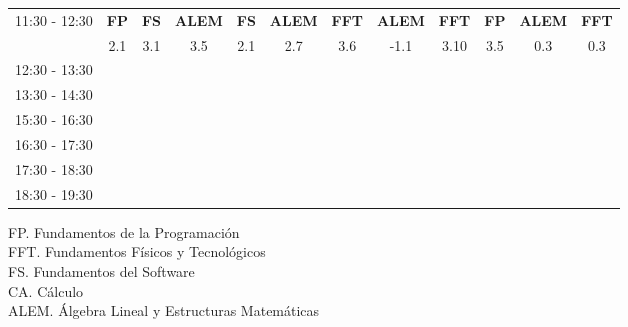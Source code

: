 \documentclass[10pt,spanish, landscape]{article}
\begin{document}
\begin{minipage}{0.7\textwidth}
\begin{tabular}{|c|ccc|ccc|ccc|ccc|ccc|}
 \hline
\multirow{2}{*}{11:30 - 12:30}  & \textbf{FP} & \textbf{FS} & \textbf{ALEM} & \textbf{FS} & \textbf{ALEM} & \textbf{FFT} & \textbf{ALEM} & \textbf{FFT} & \textbf{FP}& \multicolumn{3}{|c|}{ \cellcolor{grisclaro} \textbf{ALEM}}& \multicolumn{3}{|c|}{ \cellcolor{grisclaro} \textbf{FFT}}\\ 
 & {\footnotesize 2.1} & {\footnotesize 3.1} & {\footnotesize 3.5} & {\footnotesize 2.1} & {\footnotesize 2.7} & {\footnotesize 3.6} & {\footnotesize -1.1} & {\footnotesize 3.10} & {\footnotesize 3.5}& \multicolumn{3}{|c|}{ \cellcolor{grisclaro} {\footnotesize 0.3}}& \multicolumn{3}{|c|}{ \cellcolor{grisclaro} {\footnotesize 0.3}}\\ 
 \hline
\multirow{2}{*}{12:30 - 13:30}  &  &  &  &  &  &  &  &  &  &  &  &  &  &  & \\ 
 &  &  &  &  &  &  &  &  &  &  &  &  &  &  & \\ 
 \hline
\multirow{2}{*}{13:30 - 14:30}  &  &  &  &  &  &  &  &  &  &  &  &  &  &  & \\ 
 &  &  &  &  &  &  &  &  &  &  &  &  &  &  & \\ 
 \hline
\multirow{2}{*}{15:30 - 16:30}  &  &  &  &  &  &  &  &  &  &  &  &  &  &  & \\ 
 &  &  &  &  &  &  &  &  &  &  &  &  &  &  & \\ 
 \hline
\multirow{2}{*}{16:30 - 17:30}  &  &  &  &  &  &  &  &  &  &  &  &  &  &  & \\ 
 &  &  &  &  &  &  &  &  &  &  &  &  &  &  & \\ 
 \hline
\multirow{2}{*}{17:30 - 18:30}  &  &  &  &  &  &  &  &  &  &  &  &  &  &  & \\ 
 &  &  &  &  &  &  &  &  &  &  &  &  &  &  & \\ 
 \hline
\multirow{2}{*}{18:30 - 19:30}  &  &  &  &  &  &  &  &  &  &  &  &  &  &  & \\ 
 &  &  &  &  &  &  &  &  &  &  &  &  &  &  & \\ 
 \hline

\end{tabular}
\end{minipage}
\begin{minipage}{0.25\textwidth}
FP. Fundamentos de la Programación\\[0.5cm]
FFT. Fundamentos Físicos y Tecnológicos\\[0.5cm]
FS. Fundamentos del Software\\[0.5cm]
CA. Cálculo\\[0.5cm]
ALEM. Álgebra Lineal y Estructuras Matemáticas\\[0.5cm]
\end{minipage}
\newpage
\end{document}
